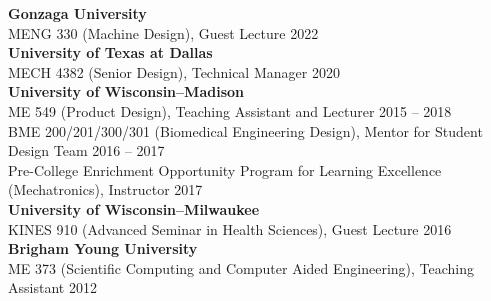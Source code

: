 \documentclass[letterpaper, 10pt]{article}
\begin{document}
\textbf{Gonzaga University}\\
MENG 330 (Machine Design), Guest Lecture \hfill 2022\\

\textbf{University of Texas at Dallas}\\
MECH 4382 (Senior Design), Technical Manager \hfill 2020\\

\textbf{University of Wisconsin--Madison}\\
ME 549 (Product Design), Teaching Assistant and Lecturer \hfill 2015 -- 2018\\
BME 200/201/300/301 (Biomedical Engineering Design), Mentor for Student Design Team \hfill 2016 -- 2017\\
Pre-College Enrichment Opportunity Program for Learning Excellence (Mechatronics), Instructor \hfill 2017\\

\textbf{University of Wisconsin--Milwaukee}\\
KINES 910 (Advanced Seminar in Health Sciences), Guest Lecture \hfill 2016\\

\textbf{Brigham Young University}\\
ME 373 (Scientiﬁc Computing and Computer Aided Engineering), Teaching Assistant \hfill 2012\\
\end{document}
